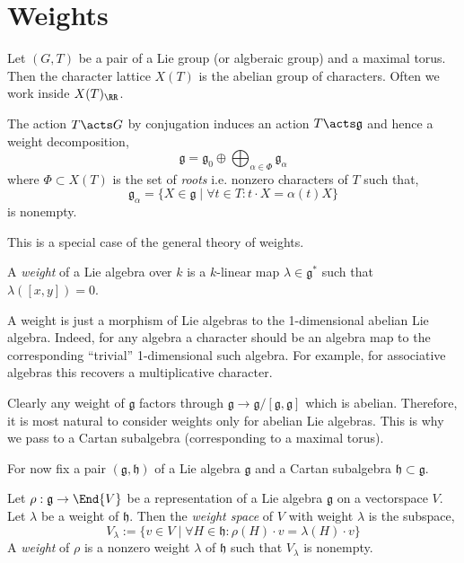 \documentclass[12pt]{article}
\begin{document}
\newpage


\section{Weights}

\newcommand{\g}{\mathfrak{g}}
\newcommand{\h}{\mathfrak{h}}
\newcommand{\ad}{\mathrm{ad}}

Let $(G, T)$ be a pair of a Lie group (or algberaic group) and a maximal torus. Then the character lattice $X(T)$ is the abelian group of characters. Often we work inside $X(T)_{\RR}$. 

\begin{defn}
The action $T \acts G$ by conjugation induces an action $T \acts \g$ and hence a weight decomposition,
\[ \g = \g_0 \oplus \bigoplus_{\alpha \in \Phi} \g_\alpha \]
where $\Phi \subset X(T)$ is the set of \textit{roots} i.e. nonzero characters of $T$ such that,
\[ \g_\alpha = \{ X \in \g \mid \forall t \in T : t \cdot X = \alpha(t) X \} \]
is nonempty.
\end{defn}

This is a special case of the general theory of weights. 

\begin{defn}
A \textit{weight} of a Lie algebra over $k$ is a $k$-linear map $\lambda \in \g^*$ such that $\lambda([x,y]) = 0$. 
\end{defn}

\begin{rmk}
A weight is just a morphism of Lie algebras to the 1-dimensional abelian Lie algebra. Indeed, for any algebra a character should be an algebra map to the corresponding ``trivial'' 1-dimensional such algebra. For example, for associative algebras this recovers a multiplicative character.
\end{rmk}

\begin{rmk}
Clearly any weight of $\g$ factors through $\g \to \g / [\g, \g]$ which is abelian. Therefore, it is most natural to consider weights only for abelian Lie algebras. This is why we pass to a Cartan subalgebra (corresponding to a maximal torus). 
\end{rmk}

For now fix a pair $(\g, \h)$ of a Lie algebra $\g$ and a Cartan subalgebra $\h \subset \g$.

\begin{defn}
Let $\rho : \g \to \End{V}$ be a representation of a Lie algebra $\g$ on a vectorspace $V$. Let $\lambda$ be a weight of $\h$. Then the \textit{weight space} of $V$ with weight $\lambda$ is the subspace,
\[ V_\lambda := \{ v \in V \mid \forall H \in \h : \rho(H) \cdot v = \lambda(H) \cdot v \} \]
A \textit{weight} of $\rho$ is a nonzero weight $\lambda$ of $\h$ such that $V_{\lambda}$ is nonempty.
\end{defn}
\end{document}
